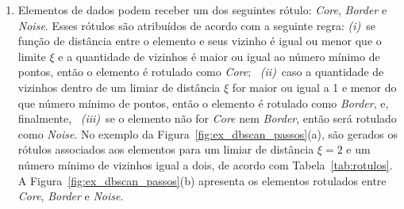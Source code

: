 \begin{enumerate}
    \item Elementos de dados podem receber um dos seguintes rótulo: \textit{Core}, \textit{Border} e \textit{Noise}.
    Esses rótulos são atribuídos de acordo com a seguinte regra:
    \textit{(i)}~se função de distância entre o elemento e seus vizinho é igual ou menor que o limite $\xi$ e a quantidade de vizinhos é maior ou igual ao número mínimo de pontos, então o elemento é rotulado como \textit{Core};
    ~\textit{(ii)}~caso a quantidade de vizinhos dentro de um limiar de distância $\xi$ for maior ou igual a 1 e menor do que número mínimo de pontos, então o elemento é rotulado como \textit{Border}, e, finalmente, 
    ~\textit{(iii)}~se o elemento não for \textit{Core} nem \textit{Border}, então será rotulado como \textit{Noise}.
    No exemplo da Figura~\ref{fig:ex_dbscan_passos}(a), são gerados os rótulos associados aos elementos para um limiar de distância $\xi = 2$ e um número mínimo de vizinhos igual a dois, de acordo com Tabela~\ref{tab:rotulos}.
    A Figura~\ref{fig:ex_dbscan_passos}(b) apresenta os elementos rotulados entre \textit{Core}, \textit{Border} e \textit{Noise}. 
    

\end{enumerate}
